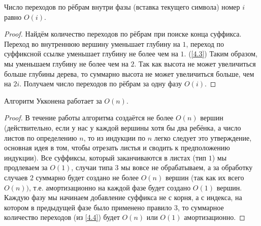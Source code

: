 \begin{lemma}
  \label{4.4}
  Число переходов по рёбрам внутри фазы (вставка текущего символа) номер $i$ равно $O(i)$.
\end{lemma}
\begin{proof}
  Найдём количество переходов по рёбрам при поиске конца суффикса. Переход во внутреннюю вершину 
  уменьшает глубину на $1$, переход по суффиксной ссылке уменьшает глубину не более чем на $1$. (\ref{4.3})
  Таким образом, мы уменьшаем глубину не более чем на $2$.
  Так как высота не может увеличиться больше глубины дерева, то суммарно высота не может увеличиться больше,
  чем на $2i$. Получаем число переходов по рёбрам за одну фазу $O(i)$.
\end{proof}

\begin{theorem}
  Алгоритм Укконена работает за $O(n)$.
\end{theorem}
\begin{proof}
  В течение работы алгоритма создаётся не более $O(n)$ вершин (действительно, если у нас у каждой вершины
  хотя бы два ребёнка, а число листов по определению $n$, то из индукции по  $n$ легко следует 
  это утверждение, основная идея в том, чтобы отрезать листья и сводить к предположению индукции). 
  Все суффиксы, который заканчиваются в листах (тип $1$) мы продлеваем за $O(1)$, случаи типа  $3$ 
  мы вовсе не обрабатываем, а за обработку случаев $2$ суммарно будет создано не более $O(n)$ вершин 
  (так как их всего $O(n))$, т.е. амортизационно на каждой фазе будет создано  $O(1)$ вершин.
  Каждую фазу мы начинаем добавление суффикса не с корня, а с индекса, на котором в предыдущей фазе
  было применено правило $3$, то суммарное количество переходов (из \ref{4.4}) будет $O(n)$ или  $O(1)$
  амортизационно. 
\end{proof}

